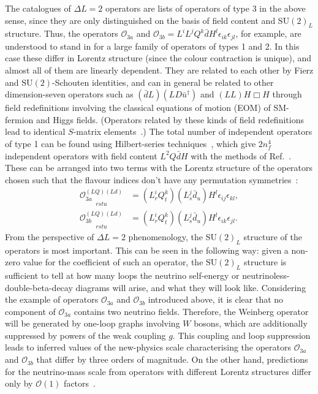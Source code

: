 The catalogues of $\Delta L = 2$ operators are lists of operators of type 3 in
the above sense, since they are only distinguished on the basis of field content
and $\mathrm{SU}(2)_{L}$ structure. Thus, the operators $\mathcal{O}_{3a}$ and
$\mathcal{O}_{3b} = L^{i}L^{j}Q^{k}\bar{d}H^{l} \epsilon_{ik}\epsilon_{jl}$, for
example, are understood to stand in for a large family of operators of types 1
and 2. In this case these differ in Lorentz structure (since the colour
contraction is unique), and almost all of them are linearly dependent. They are
related to each other by Fierz and $\mathrm{SU}(2)$-Schouten identities, and can
in general be related to other dimension-seven operators such as
$(\bar{d} L) (L D \bar{u}^{\dagger})$ and $(LL)H\Box H$ through field
redefinitions involving the classical equations of motion (EOM) of SM-fermion
and Higgs fields. (Operators related by these kinds of field redefinitions lead
to identical $S$-matrix elements~\cite{Arzt:1993gz}.) The total number of
independent operators of type 1 can be found using Hilbert-series
techniques~\cite{Lehman:2015via, Henning:2015daa, Lehman:2015coa,
  Henning:2015alf, Henning:2017fpj}, which give $2n_{f}^{4}$ independent
operators with field content $L^{2} Q \bar{d} H$ with the methods of
Ref.~\cite{Henning:2015alf}. These can be arranged into two terms with the
Lorentz structure of the operators chosen such that the flavour indices don't
have any permutation symmetries~\cite{Lehman:2014jma}:
\begin{subequations}
  \label{eq:ch2-o3a3b-complete}
  \begin{align}
    \underset{rstu}{\mathcal{O}_{3a}^{(LQ)(Ld)}} &= (L^{i}_{r}Q^{k}_{t})(L^{j}_{s}\bar{d}_{u})H^{l} \epsilon_{ij} \epsilon_{kl},\\
    \underset{rstu}{\mathcal{O}_{3b}^{(LQ)(Ld)}} &= (L^{i}_{r}Q^{k}_{t})(L^{j}_{s}\bar{d}_{u})H^{l} \epsilon_{ik} \epsilon_{jl}.
  \end{align}
\end{subequations}
From the perspective of $\Delta L = 2$ phenomenology, the $\mathrm{SU}(2)_L$
structure of the operators is most important. This can be seen in the following
way: given a non-zero value for the coefficient of such an operator, the
$\mathrm{SU}(2)_{L}$ structure is sufficient to tell at how many loops the
neutrino self-energy or neutrinoless-double-beta-decay diagrams will arise, and
what they will look like. Considering the example of operators
$\mathcal{O}_{3a}$ and $\mathcal{O}_{3b}$ introduced above, it is clear that no
component of $\mathcal{O}_{3a}$ contains two neutrino fields. Therefore, the
Weinberg operator will be generated by one-loop graphs involving $W$ bosons,
which are additionally suppressed by powers of the weak coupling $g$. This
coupling and loop suppression leads to inferred values of the new-physics scale
characterising the operators $\mathcal{O}_{3a}$ and $\mathcal{O}_{3b}$ that
differ by three orders of magnitude. On the other hand, predictions for the
neutrino-mass scale from operators with different Lorentz structures differ only
by $\mathcal{O}(1)$ factors~\cite{deGouvea:2007qla}.

